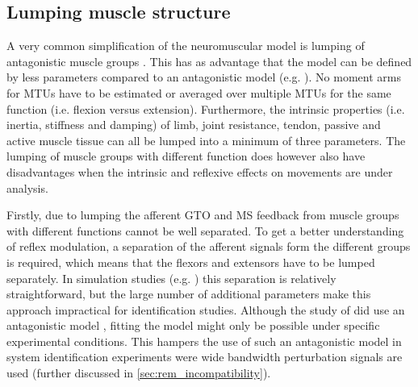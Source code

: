 

\subsection{Lumping muscle structure}
\label{sec:rem_lumping-muscle}
A very common simplification of the neuromuscular model is lumping of antagonistic muscle groups \cite{zhang_simultaneous_1997, van_der_helm_identification_2002, schouten_nmclab_2008, mugge_rigorous_2010}. This has as advantage that the model can be defined by less parameters compared to an antagonistic model (e.g. \cite{de_gooijer-van_de_groep_estimation_2016}). No moment arms for MTUs have to be estimated or averaged over multiple MTUs for the same function (i.e. flexion versus extension). Furthermore, the intrinsic properties (i.e. inertia, stiffness and damping) of limb, joint resistance, tendon, passive and active muscle tissue can all be lumped into a minimum of three parameters. The lumping of muscle groups with different function does however also have disadvantages when the intrinsic and reflexive effects on movements are under analysis. 

Firstly, due to lumping the afferent GTO and MS feedback from muscle groups with different functions cannot be well separated.  To get a better understanding of reflex modulation, a separation of the afferent signals form the different groups is required, which means that the flexors and extensors have to be lumped separately. In simulation studies (e.g. \cite{mugge_modeling_2012}) this separation is relatively straightforward, but the large number of additional parameters make this approach impractical for identification studies. Although the study of \citeauthor{de_gooijer-van_de_groep_estimation_2016} did use an antagonistic model \cite{de_gooijer-van_de_groep_estimation_2016}, fitting the model might only be possible under specific experimental conditions. This hampers the use of such an antagonistic model in system identification experiments were wide bandwidth perturbation signals are used (further discussed in \autoref{sec:rem_incompatibility}).

